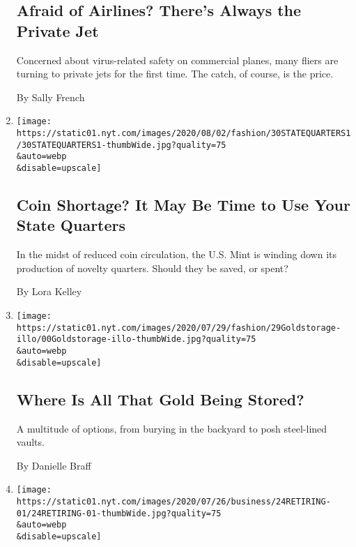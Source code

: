 \begin{enumerate}
  \hypertarget{afraid-of-airlines-theres-always-the-private-jet}{%
  \subsection{Afraid of Airlines? There's Always the Private
  Jet}\label{afraid-of-airlines-theres-always-the-private-jet}}

  Concerned about virus-related safety on commercial planes, many fliers
  are turning to private jets for the first time. The catch, of course,
  is the price.

  By Sally French
\item
  \href{/2020/07/30/style/state-quarters-coin-collectors-shortage-us-mint.html}{}

  \texttt{[image: https://static01.nyt.com/images/2020/08/02/fashion/30STATEQUARTERS1/30STATEQUARTERS1-thumbWide.jpg?quality=75\\\&auto=webp\\\&disable=upscale]}

  \hypertarget{coin-shortage-it-may-be-time-to-use-your-state-quarters}{%
  \subsection{Coin Shortage? It May Be Time to Use Your State
  Quarters}\label{coin-shortage-it-may-be-time-to-use-your-state-quarters}}

  In the midst of reduced coin circulation, the U.S. Mint is winding
  down its production of novelty quarters. Should they be saved, or
  spent?

  By Lora Kelley
\item
  \href{/2020/07/28/style/gold-storage.html}{}

  \texttt{[image: https://static01.nyt.com/images/2020/07/29/fashion/29Goldstorage-illo/00Goldstorage-illo-thumbWide.jpg?quality=75\\\&auto=webp\\\&disable=upscale]}

  \hypertarget{where-is-all-that-gold-being-stored}{%
  \subsection{Where Is All That Gold Being
  Stored?}\label{where-is-all-that-gold-being-stored}}

  A multitude of options, from burying in the backyard to posh
  steel-lined vaults.

  By Danielle Braff
\item
  \href{/2020/07/25/business/retirement-savings-mentor.html}{}

  \texttt{[image: https://static01.nyt.com/images/2020/07/26/business/24RETIRING-01/24RETIRING-01-thumbWide.jpg?quality=75\\\&auto=webp\\\&disable=upscale]}


\end{enumerate}
